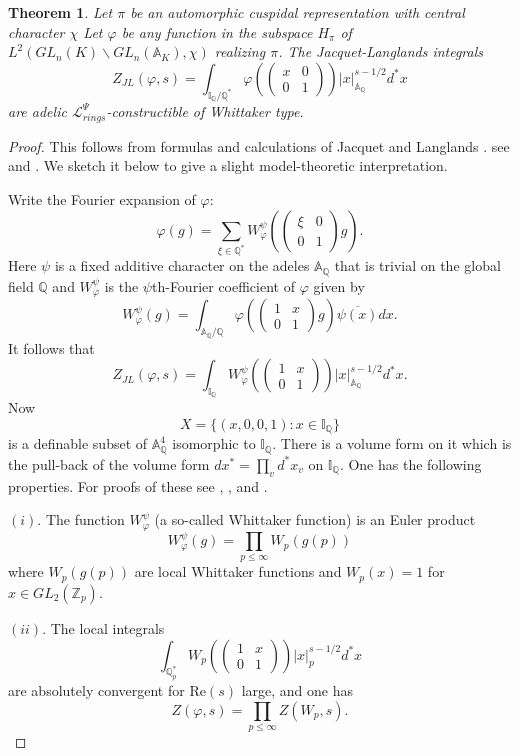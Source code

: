 \documentclass[12pt]{amsart}
\def\A{\mathbb{A}}
\def\I{\mathbb{I}}
\def\Z{\mathbb{Z}}
\def\cL{\mathcal{L}}
\def\Q{\mathbb{Q}}
\def\cL{\mathcal{L}}
\newtheorem{thm}{Theorem}[section]
\numberwithin{equation}{section}
\begin{document}
\begin{thm}\label{ex-jl} Let $\pi$ be an automorphic cuspidal representation with central character $\chi$ Let $\varphi$ be any function in the subspace $H_{\pi}$ of $L^2(GL_n(K)\backslash GL_n(\A_K),\chi)$ realizing $\pi$. 
The Jacquet-Langlands integrals 
$$Z_{JL}(\varphi,s)=\int_{\I_{\Q}/\Q^*} \varphi(\begin{pmatrix} x & 0\\ 0 & 1\end{pmatrix})|x|^{s-1/2}_{\A_{\Q}} d^*x$$
are adelic $\cL_{rings}^{\Psi}$-constructible of Whittaker type.
\end{thm}
\begin{proof} This follows from formulas and calculations of Jacquet and Langlands \cite{jac-lang}. 
see \cite{jac-lang} and \cite{godem-book}. We sketch it below to give a slight model-theoretic interpretation.

Write the Fourier expansion of $\varphi$:
$$\varphi(g)=\sum_{\xi \in \Q^*} W_{\varphi}^{\psi}(\begin{pmatrix} \xi & 0\\ 0 & 1\end{pmatrix}g).$$
Here $\psi$ is a fixed additive character on the adeles $\A_{\Q}$ that is trivial on the global field $\Q$ and 
$W_{\varphi}^{\psi}$ is the $\psi$th-Fourier coefficient of $\varphi$ given by 
$$W_{\varphi}^{\psi}(g)=\int_{\A_{\Q}/\Q}\varphi(\begin{pmatrix} 1 & x\\ 0 & 1\end{pmatrix}g)\overline{\psi(x)}dx.$$
It follows that
$$Z_{JL}(\varphi,s)=\int_{\I_{\Q}}W_{\varphi}^{\psi}(\begin{pmatrix} 1 & x\\ 0 & 1\end{pmatrix})|x|^{s-1/2}_{\A_{\Q}} d^*x.$$
Now 
$$X=\{(x,0,0,1): x\in \I_{\Q}\}$$
is a definable subset of $\A_{\Q}^4$ isomorphic to $\I_{\Q}$. There is a volume form on it which is the pull-back of the volume form $dx^*=\prod_v d^*x_v$ on $\I_{\Q}$. One has the following properties. For
proofs of these see \cite{jac-lang}, \cite{godem-book}, and \cite[pp.11]{GS-book}. 

$(i).$ The function $W_{\varphi}^{\psi}$ (a so-called Whittaker function) is an Euler product
$$W_{\varphi}^{\psi}(g)=\prod_{p\leq \infty} W_p(g(p))$$
where $W_p(g(p))$ are local Whittaker functions and $W_p(x)=1$ for $x\in GL_2(\Z_p)$. 

$(ii).$ The local integrals 
$$\int_{\Q_p^*}W_p(\begin{pmatrix} 1 & x\\ 0 & 1\end{pmatrix})|x|^{s-1/2}_{p} d^* x$$
are absolutely convergent for $\mathrm{Re}(s)$ large, and one has 
$$Z(\varphi,s)=\prod_{p\leq \infty} Z(W_p,s).$$


\end{proof}
\end{document}

